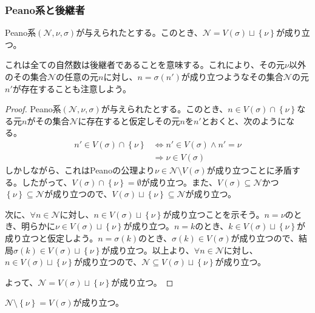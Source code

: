 \documentclass[dvipdfmx]{jsarticle}
\begin{document}
\subsubsection{Peano系と後継者}%
\begin{thm}\label{1.2.4.7}
Peano系$\left( \mathcal{N,}\nu,\sigma \right)$が与えられたとする。このとき、$\mathcal{N} =V(\sigma) \sqcup \left\{ \nu \right\}$が成り立つ。
\end{thm}
これは全ての自然数は後継者であることを意味する。これにより、その元$\nu$以外のその集合$\mathcal{N}$の任意の元$n$に対し、$n = \sigma\left( n' \right)$が成り立つようなその集合$\mathcal{N}$の元$n'$が存在することも注意しよう。
\begin{proof}
Peano系$\left( \mathcal{N,}\nu,\sigma \right)$が与えられたとする。このとき、$n \in V(\sigma) \cap \left\{ \nu \right\}$なる元$n$がその集合$\mathcal{N}$に存在すると仮定しその元$n$を$n'$とおくと、次のようになる。
\begin{align*}
n' \in V(\sigma) \cap \left\{ \nu \right\} &\Leftrightarrow n' \in V(\sigma) \land n' = \nu\\
&\Rightarrow \nu \in V(\sigma)
\end{align*}
しかしながら、これはPeanoの公理より$\nu \in \mathcal{N \setminus}V(\sigma)$が成り立つことに矛盾する。したがって、$V(\sigma) \cap \left\{ \nu \right\} = \emptyset$が成り立つ。また、$V(\sigma) \subseteq \mathcal{N}$かつ$\left\{ \nu \right\} \subseteq \mathcal{N}$が成り立つので、$V(\sigma) \sqcup \left\{ \nu \right\} \subseteq \mathcal{N}$が成り立つ。\par
次に、$\forall n \in \mathcal{N}$に対し、$n \in V(\sigma) \sqcup \left\{ \nu \right\}$が成り立つことを示そう。$n = \nu$のとき、明らかに$\nu \in V(\sigma) \sqcup \left\{ \nu \right\}$が成り立つ。$n = k$のとき、$k \in V(\sigma) \sqcup \left\{ \nu \right\}$が成り立つと仮定しよう。$n = \sigma(k)$のとき、$\sigma(k) \in V(\sigma)$が成り立つので、結局$\sigma(k) \in V(\sigma) \sqcup \left\{ \nu \right\}$が成り立つ。以上より、$\forall n \in \mathcal{N}$に対し、$n \in V(\sigma) \sqcup \left\{ \nu \right\}$が成り立つので、$\mathcal{N \subseteq}V(\sigma) \sqcup \left\{ \nu \right\}$が成り立つ。\par
よって、$\mathcal{N} =V(\sigma) \sqcup \left\{ \nu \right\}$が成り立つ。
\end{proof}
\begin{thm}\label{1.2.4.8}
$\mathcal{N \setminus}\left\{ \nu \right\} = V(\sigma)$が成り立つ。
\end{thm}
\end{document}
